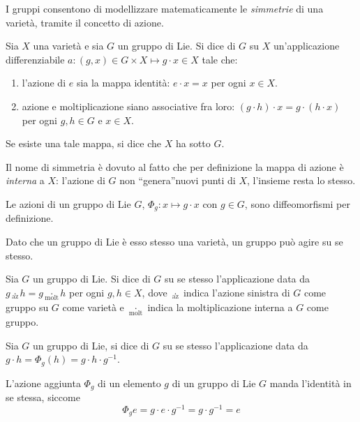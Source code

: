 I gruppi consentono di modellizzare matematicamente le \emph{simmetrie} di una varietà, tramite il concetto di azione.
\begin{definition}
  Sia $X$ una varietà e sia $G$ un gruppo di Lie. Si dice  di $G$ su $X$ un'applicazione differenziabile $a:(g,x) \in G \times X \mapsto g \cdot x \in X$ tale che:
  \begin{enumerate}
    \item l'azione di $e$ sia la mappa identità: $e \cdot x = x$ per ogni $x \in X$.
    \item azione e moltiplicazione siano associative fra loro: $(g \cdot h) \cdot x = g\cdot (h\cdot x)$ per ogni $g,h \in G$ e $x \in X$.
  \end{enumerate}
Se esiste una tale mappa, si dice che $X$ ha  sotto $G$. 
\end{definition}
\begin{remark}
  Il nome di simmetria è dovuto al fatto che per definizione la mappa di azione è \emph{interna} a $X$: l'azione di $G$ non \textquotedblleft genera\textquotedblright nuovi punti di $X$, l'insieme resta lo stesso.
\end{remark}
\begin{remark}
  Le azioni di un gruppo di Lie $G$, $\Phi_g: x \mapsto g\cdot x$ con $g \in G$, sono diffeomorfismi per definizione.
\end{remark}

Dato che un gruppo di Lie è esso stesso una varietà, un gruppo può agire su se stesso.
\begin{definition}
  Sia $G$ un gruppo di Lie. Si dice  di $G$ su se stesso l'applicazione data da $g \underset{\text{az}}{\cdot} h = g \underset{\text{molt}}{\cdot} h$ per ogni $g,h \in X$, dove $\underset{\text{az}}{\cdot}$ indica l'azione sinistra di $G$ come gruppo su $G$ come varietà e $\underset{\text{molt}}{\cdot}$ indica la moltiplicazione interna a $G$ come gruppo.
\end{definition}
\begin{definition}
  Sia $G$ un gruppo di Lie, si dice  di $G$ su se stesso l'applicazione data da $g \cdot h = \Phi_g(h) = g \cdot h \cdot g^{-1}$.
\end{definition}
\begin{remark} \label{rem:adjIdentity}
  L'azione aggiunta $\Phi_g$ di un elemento $g$ di un gruppo di Lie $G$ manda l'identità in se stessa, siccome \begin{equation*}
  \Phi_g e = g\cdot e\cdot g^{-1} = g\cdot g^{-1} = e
  \end{equation*} 
\end{remark}


